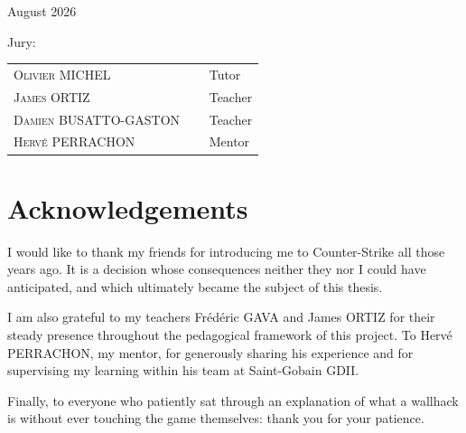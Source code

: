\begin{titlepage}
\begin{center}
			August 2026
		\end{center}

		\vspace{1cm}

		\vfill
		Jury:\\
		\begin{center}
			\begin{tabular}{ll}
				\textsc{Olivier MICHEL}   &  $\quad$ Tutor\\
				\textsc{James ORTIZ}   &  $\quad$ Teacher\\
				\textsc{Damien BUSATTO-GASTON}   &  $\quad$ Teacher\\
				\textsc{Hervé PERRACHON}   &  $\quad$ Mentor\\
			\end{tabular}
		\end{center}

    \titlepagedecoration
	\newpage
	\thispagestyle{empty}
	\color{colorEPISEN-MEMOIRE}

	\section*{Acknowledgements}
	\color{black}
    	I would like to thank my friends for introducing me to Counter-Strike all those years ago. It is a decision whose consequences neither they nor I could have anticipated, and which ultimately became the subject of this thesis.

    	I am also grateful to my teachers Frédéric GAVA and James ORTIZ for their steady presence throughout the pedagogical framework of this project. To Hervé PERRACHON, my mentor, for generously sharing his experience and for supervising my learning within his team at Saint-Gobain GDII.

    	Finally, to everyone who patiently sat through an explanation of what a wallhack is without ever touching the game themselves: thank you for your patience.

	\end{titlepage}
